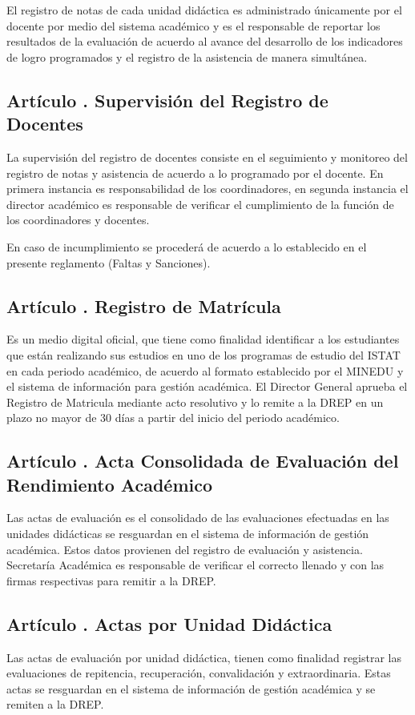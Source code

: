El registro de notas de cada unidad didáctica es administrado únicamente por el docente por medio del sistema académico y es el responsable de reportar los resultados de la evaluación de acuerdo al avance del desarrollo de los indicadores de logro programados y el registro de la asistencia de manera simultánea. 
\subsection{Artículo . Supervisión del Registro de Docentes}
\addtocounter{ns}{1}
La supervisión del registro de docentes consiste en el seguimiento y monitoreo del registro de notas y asistencia de acuerdo a lo programado por el docente. En primera instancia es responsabilidad de los coordinadores, en segunda instancia el director académico es responsable de verificar el cumplimiento de la función de los coordinadores y docentes. 

En caso de incumplimiento se procederá de acuerdo a lo establecido en el presente reglamento (Faltas y Sanciones). 
\subsection{Artículo . Registro de Matrícula}
\addtocounter{ns}{1}
Es un medio digital oficial, que tiene como finalidad identificar a los estudiantes que están realizando sus estudios en uno de los programas de estudio del ISTAT en cada periodo académico, de acuerdo al formato establecido por el MINEDU y el sistema de información para gestión académica. El Director General aprueba el Registro de Matricula mediante acto resolutivo y lo remite a la DREP en un plazo no mayor de 30 días a partir del inicio del periodo académico. 
\subsection{Artículo . Acta Consolidada de Evaluación del Rendimiento Académico}
\addtocounter{ns}{1}
Las actas de evaluación es el consolidado de las evaluaciones efectuadas en las unidades didácticas se resguardan en el sistema de información de gestión académica. Estos datos provienen del registro de evaluación y asistencia. Secretaría Académica es responsable de verificar el correcto llenado y con las firmas respectivas para remitir a la DREP. 
\subsection{Artículo . Actas por Unidad Didáctica}
\addtocounter{ns}{1}
Las actas de evaluación por unidad didáctica, tienen como finalidad registrar las evaluaciones de repitencia, recuperación, convalidación y extraordinaria. Estas actas se resguardan en el sistema de información de gestión académica y se remiten a la DREP. 
